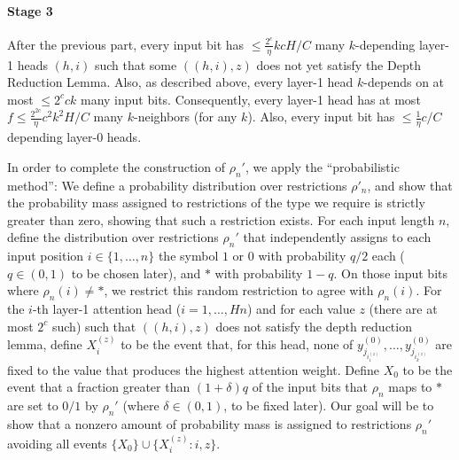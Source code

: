\documentclass[11pt,a4paper]{article}
\begin{document}



\paragraph{Stage 3}
After the previous part, every input bit has $\leq \frac{2^c}{\eta}kcH/C$ many $k$-depending layer-1 heads $(h,i)$ such that some $((h,i),z)$ does not yet satisfy the Depth Reduction Lemma.
Also, as described above, every layer-1 head $k$-depends on at most $\leq 2^cck$ many input bits.
Consequently, every layer-1 head has at most $f \leq \frac{2^{2c}}{\eta}c^2k^2H/C$ many $k$-neighbors (for any $k$).
Also, every input bit has $\leq \frac{1}{\eta}c/C$ depending layer-0 heads.


In order to complete the construction of $\rho_n'$, we apply the ``probabilistic method'': We define a probability distribution over restrictions $\rho'_n$, and show that the probability mass assigned to restrictions of the type we require is strictly greater than zero, showing that such a restriction exists.
For each input length $n$, define the distribution over restrictions $\rho_n'$ that independently assigns to each input position $i \in \{1, \dots, n\}$ the symbol $1$ or $0$ with probability $q/2$ each ($q \in (0,1)$ to be chosen later), and $*$ with probability $1-q$.
On those input bits where $\rho_n(i) \neq *$, we restrict this random restriction to agree with $\rho_n(i)$.
For the $i$-th layer-1 attention head ($i=1,\dots,Hn$) and for each value $z$ (there are at most $2^c$ such) such that $((h,i),z)$ does not satisfy the depth reduction lemma, define $X_i^{(z)}$ to be the event that, for this head, none of $y_{j_{i_1^{(z)}}}^{(0)}, \dots, y_{j_{i_k^{(z)}}}^{(0)}$ are fixed to the value that produces the highest attention weight. %
Define $X_0$ to be the event that a fraction greater than $(1+\delta)q$ of the input bits that $\rho_n$ maps to $*$ are set to $0/1$ by $\rho_n'$ (where $\delta \in (0,1)$, to be fixed later).
Our goal will be to show that a nonzero amount of probability mass is assigned to restrictions $\rho_n'$ avoiding all events $\{X_0\} \cup \{X_i^{(z)} : i, z\}$.
\end{document}
